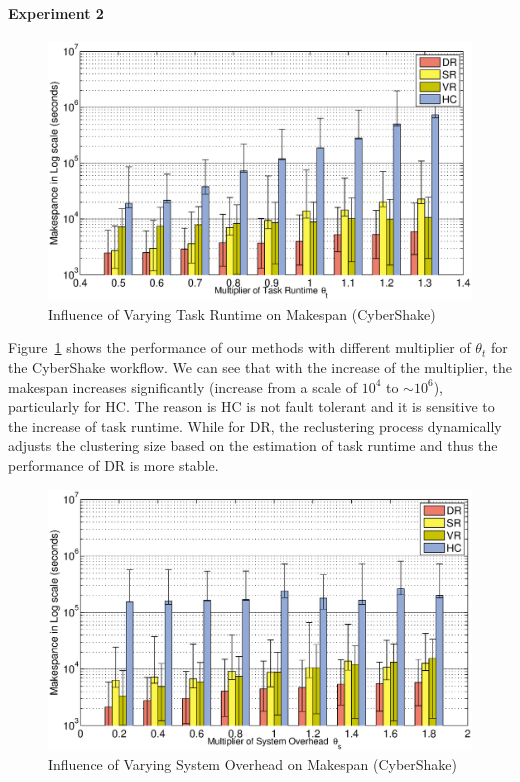 \documentclass{IOS-Book-Article}
\begin{document}
\paragraph{\textbf{Experiment 2}}

\begin{figure}[!htb]
\centering
  \includegraphics[width=1\linewidth]{t.eps}
  \caption{ Influence of Varying Task Runtime on Makespan (CyberShake)}
  \label{fig:expr_t}
\end{figure}

Figure~\ref{fig:expr_t} shows the performance of our methods with different multiplier of $\theta_{t}$ for the CyberShake workflow. We can see that with the increase of the multiplier, the makespan increases significantly (increase from a scale of $10^4$ to $\sim 10^6$), particularly for HC. The reason is HC is not fault tolerant and it is sensitive to the increase of task runtime. While for DR, the reclustering process dynamically adjusts the clustering size based on the estimation of task runtime and thus the performance of DR is more stable. 

\begin{figure}[!htb]
\centering
  \includegraphics[width=1\linewidth]{d.eps}
  \caption{Influence of Varying System Overhead on Makespan (CyberShake)}
  \label{fig:expr_d}
\end{figure}
\end{document}
